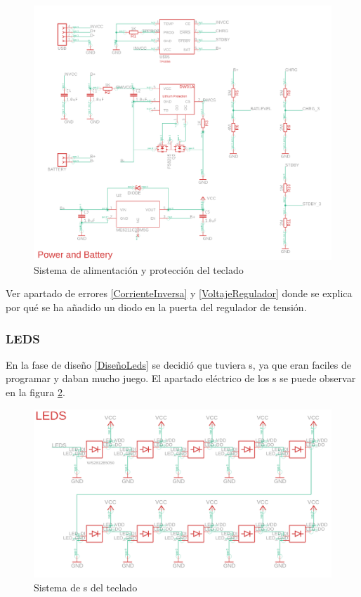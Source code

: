 \begin{figure}[H]
    \centering
    \includegraphics[width=1.0\textwidth]{imagenes/Capitulos/Cap04/Battery.png}
    \caption{Sistema de alimentación y protección del teclado \cite{Repo:ImagenCircuito}}
    \label{fig:CircuitoBateriaAlimentacion}
\end{figure}

\begin{tcolorbox}[colback=red!11!white, colframe=red!50!white, title=Errores]
    Ver apartado de errores \ref{CorrienteInversa} y \ref{VoltajeRegulador} donde se explica por qué se ha añadido un diodo en la puerta del regulador de tensión.
\end{tcolorbox}

\newpage
\subsubsection{\gls{LED}S}
En la fase de diseño \ref{DiseñoLeds} se decidió que tuviera s, ya que eran faciles de programar y daban mucho juego. El apartado eléctrico de los s se puede observar en la figura \ref{fig:CircuitoLeds}.

\begin{figure}[H]
    \centering
    \includegraphics[width=1.0\textwidth]{imagenes/Capitulos/Cap04/LEDs.png}
    \caption{Sistema de s del teclado \cite{Repo:ImagenCircuito}}
    \label{fig:CircuitoLeds}
\end{figure}

